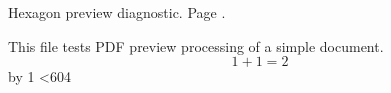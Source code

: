 \documentclass{article}
\begin{document}
\newcount\DiagnosticPage
{}
\loop
\noindent Hexagon preview diagnostic. Page \the\DiagnosticPage.
\par This file tests PDF preview processing of a simple document.
\[1+1=2\]
\clearpage
\advance\DiagnosticPage by 1
\ifnum\DiagnosticPage<604
\repeat
\end{document}

